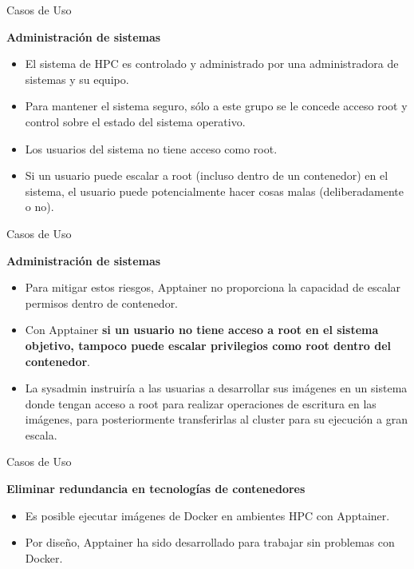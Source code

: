\documentclass[11pt]{beamer}
\begin{document}
\begin{frame}{Casos de Uso}

\textbf{Administración de sistemas}

\begin{itemize}
	\item El sistema de HPC es controlado y administrado por una administradora de sistemas y su equipo. 
	\item Para mantener el sistema seguro, sólo a este grupo se le concede acceso root y control sobre el estado del sistema operativo.
	\item Los usuarios del sistema no tiene acceso como root.
	\item Si un usuario puede escalar a root (incluso dentro de un contenedor) en el sistema, el usuario puede potencialmente hacer cosas malas (deliberadamente o no). 
\end{itemize}
\end{frame}

\begin{frame}{Casos de Uso}

\textbf{Administración de sistemas}

\begin{itemize}
	\item Para mitigar estos riesgos, Apptainer no proporciona la capacidad de escalar permisos dentro de contenedor.
	\item Con Apptainer \textbf{si un usuario no tiene acceso a root en el sistema objetivo, tampoco puede escalar privilegios como root dentro del contenedor}. 
	\item La sysadmin instruiría  a las usuarias a desarrollar sus imágenes en un sistema donde tengan acceso a root para realizar operaciones de escritura en las imágenes, para posteriormente transferirlas al cluster para su ejecución a gran escala.
\end{itemize}
\end{frame}

\begin{frame}{Casos de Uso}

\textbf{Eliminar redundancia en tecnologías de contenedores}

\begin{itemize}
	\item Es posible ejecutar imágenes de Docker en ambientes HPC con Apptainer.
	\item Por diseño, Apptainer ha sido desarrollado para trabajar sin problemas con Docker. 
\end{itemize}
\end{frame}
\end{document}
